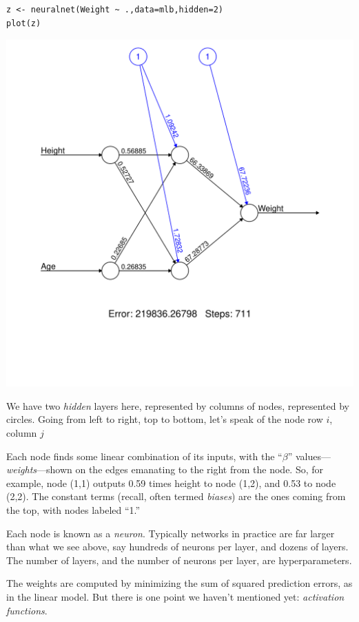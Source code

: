\begin{lstlisting}
z <- neuralnet(Weight ~ .,data=mlb,hidden=2) 
plot(z) 
\end{lstlisting}

\includegraphics[width=5.5in]{MLBnn.pdf}

We have two \textit{hidden} layers here, represented by columns of
nodes, represented by circles.  Going from left to right, top to bottom,
let's speak of the node row $i$, column $j$ 

Each node finds some linear combination of its inputs, with the
``$\beta$'' values---\textit{weights}---shown on the edges emanating to
the right from the node.  So, for example, node (1,1) outputs 0.59 times
height to node (1,2), and 0.53 to node (2,2).  The constant terms
(recall, often termed \textit{biases}) are the ones coming from the top,
with nodes labeled ``1.''

Each node is known as a \textit{neuron}.  Typically networks in practice
are far larger than what we see above, say hundreds of neurons per
layer, and dozens of layers.  The number of layers, and the number of
neurons per layer, are hyperparameters.

The weights are computed by minimizing the sum of squared prediction
errors, as in the linear model.  But there is one point we haven't
mentioned yet:  \textit{activation functions}.  

